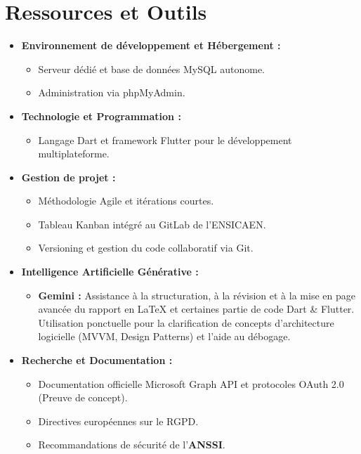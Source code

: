 \documentclass[a4paper,12pt]{article}
\begin{document}
\section{Ressources et Outils}
\begin{itemize}[label={\color{accentColor}\textbullet}, itemsep=5pt]
    \item \textbf{Environnement de développement et Hébergement :} 
    \begin{itemize}
        \item Serveur dédié et base de données MySQL autonome.
        \item Administration via phpMyAdmin.
    \end{itemize}
    
    \item \textbf{Technologie et Programmation :} 
    \begin{itemize}
        \item Langage Dart et framework Flutter pour le développement multiplateforme.
    \end{itemize}

    \item \textbf{Gestion de projet :} 
    \begin{itemize}
        \item Méthodologie Agile et itérations courtes.
        \item Tableau Kanban intégré au GitLab de l'ENSICAEN.
        \item Versioning et gestion du code collaboratif via Git.
    \end{itemize}

    \item \textbf{Intelligence Artificielle Générative :}
    \begin{itemize}
        \item \textbf{Gemini :} Assistance à la structuration, à la révision et à la mise en page avancée du rapport en LaTeX et certaines partie de code Dart \& Flutter. Utilisation ponctuelle pour la clarification de concepts d'architecture logicielle (MVVM, Design Patterns) et l'aide au débogage.
    \end{itemize}

    \item \textbf{Recherche et Documentation :}
    \begin{itemize}
        \item Documentation officielle Microsoft Graph API et protocoles OAuth 2.0 (Preuve de concept).
        \item Directives européennes sur le RGPD.
        \item Recommandations de sécurité de l'\textbf{ANSSI}. 
    \end{itemize}
\end{itemize}
\end{document}

